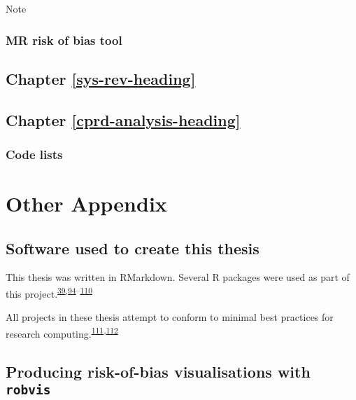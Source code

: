 \documentclass[a4paper, twoside]{templates/ociamthesis}
\begin{document}
Note

\hypertarget{appendix-mr-rob}{%
\subsection{MR risk of bias tool}\label{appendix-mr-rob}}

\hypertarget{appendix-sys-rev}{%
\section{Chapter \ref{sys-rev-heading}}\label{appendix-sys-rev}}

\hypertarget{appendix-cprd-analysis}{%
\section{Chapter \ref{cprd-analysis-heading}}\label{appendix-cprd-analysis}}

\hypertarget{code-lists}{%
\subsection{Code lists}\label{code-lists}}

\hypertarget{other-appendix-heading}{%
\chapter{Other Appendix}\label{other-appendix-heading}}

\hypertarget{software-used-to-create-this-thesis}{%
\section{Software used to create this thesis}\label{software-used-to-create-this-thesis}}

This thesis was written in RMarkdown. Several R packages were used as part of this project.\textsuperscript{\protect\hyperlink{ref-rbiorxiv}{39},\protect\hyperlink{ref-base}{94}--\protect\hyperlink{ref-xfun}{110}}

All projects in these thesis attempt to conform to minimal best practices for research computing.\textsuperscript{\protect\hyperlink{ref-wilson2014}{111},\protect\hyperlink{ref-wilson2017}{112}}

\hypertarget{appendix-robvis}{%
\section{\texorpdfstring{Producing risk-of-bias visualisations with \texttt{robvis}}{Producing risk-of-bias visualisations with robvis}}\label{appendix-robvis}}
\end{document}
